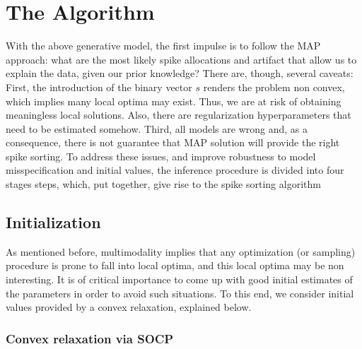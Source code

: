 \documentclass[12pt,letterpaper,fleqn]{article}
\begin{document}
\section{The Algorithm}
With the above generative model, the first impulse is to follow the MAP approach: what are the most likely spike allocations and artifact that allow us to explain the data, given our prior knowledge? There are, though, several caveats: First, the introduction of the binary vector $s$ renders the problem non convex, which implies many local optima may exist. Thus, we are at risk of obtaining meaningless local solutions. Also, there are regularization hyperparameters that need to be estimated somehow. Third, all models are wrong and, as a consequence, there is not guarantee that MAP solution will provide the right spike sorting. To address these issues, and improve robustness to model misspecification and initial values, the inference procedure is divided into four stages steps, which, put together, give rise to the spike sorting algorithm


 \subsection{Initialization}
 As mentioned before, multimodality implies that any optimization (or sampling) procedure is prone to fall into local optima, and this local optima may be non interesting. It is of critical importance to come up with good initial estimates of the parameters in order to avoid such situations. To this end, we consider initial values provided by a convex relaxation, explained below.
 
 \subsubsection{Convex relaxation via SOCP}
 
\end{document}
